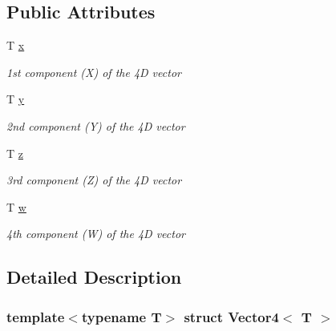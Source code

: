 \subsection*{Public Attributes}
\begin{DoxyCompactItemize}
\item 
\mbox{\label{struct_vector4_a2cedf20d2f695a4f0254681b13311ac9}} 
T \mbox{\hyperlink{struct_vector4_a2cedf20d2f695a4f0254681b13311ac9}{x}}
\begin{DoxyCompactList}\small\item\em 1st component (X) of the 4D vector \end{DoxyCompactList}\item 
\mbox{\label{struct_vector4_aad001ba27515dc2dcb921e9c83596520}} 
T \mbox{\hyperlink{struct_vector4_aad001ba27515dc2dcb921e9c83596520}{y}}
\begin{DoxyCompactList}\small\item\em 2nd component (Y) of the 4D vector \end{DoxyCompactList}\item 
\mbox{\label{struct_vector4_a5a7a1452d661e0b24e4b04c4dbff8ae7}} 
T \mbox{\hyperlink{struct_vector4_a5a7a1452d661e0b24e4b04c4dbff8ae7}{z}}
\begin{DoxyCompactList}\small\item\em 3rd component (Z) of the 4D vector \end{DoxyCompactList}\item 
\mbox{\label{struct_vector4_a83daff43fa2b88b4e76474f4b9a45276}} 
T \mbox{\hyperlink{struct_vector4_a83daff43fa2b88b4e76474f4b9a45276}{w}}
\begin{DoxyCompactList}\small\item\em 4th component (W) of the 4D vector \end{DoxyCompactList}\end{DoxyCompactItemize}


\subsection{Detailed Description}
\subsubsection*{template$<$typename T$>$\newline
struct Vector4$<$ T $>$}

